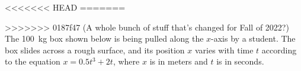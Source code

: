 \documentclass{../../oss-apphys-exam}
\newcounter{lastmc}
\begin{document}
\begin{questions}
<<<<<<< HEAD
=======
  \setcounter{question}{\value{lastmc}}
%    
%    

>>>>>>> 0187f47 (A whole bunch of stuff that's changed for Fall of 2022?)
  \question The \SI{100}{\kilo\gram} box shown below is being pulled along the
  $x$-axis by a student. The box slides across a rough surface, and its
  position $x$ varies with time $t$ according to the equation
  $x= 0.5t^3+2t$, where $x$ is in meters and $t$ is in seconds.
\end{questions}
\end{document}
